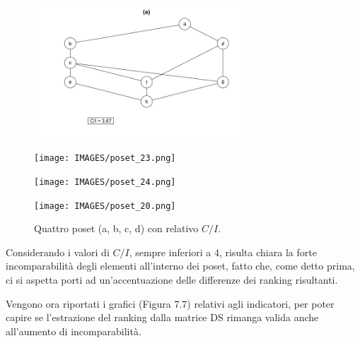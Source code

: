 \documentclass{report}
\begin{document}
\begin{figure}[H]
  \centering
  \begin{minipage}[b]{0.4\textwidth}
    \includegraphics[width=8cm]{IMAGES/poset_17.png}
  \end{minipage}
  \hfill
  \begin{minipage}[b]{0.4\textwidth}
    \texttt{[image: IMAGES/poset\_23.png]}
  \end{minipage}
  \hfill
  \begin{minipage}[b]{0.4\textwidth}
    \texttt{[image: IMAGES/poset\_24.png]}
  \end{minipage}
  \hfill
  \begin{minipage}[b]{0.4\textwidth}
    \texttt{[image: IMAGES/poset\_20.png]}
  \end{minipage}
  \caption{Quattro poset (a, b, c, d) con relativo $C/I$.}
\end{figure}

Considerando i valori di $C/I$, sempre inferiori a 4, risulta chiara la forte incomparabilità degli elementi all'interno dei poset, fatto che, come detto prima, ci si aspetta porti ad un'accentuazione delle differenze dei ranking risultanti.


Vengono ora riportati i grafici (Figura 7.7) relativi agli indicatori, per poter capire se l'estrazione del ranking dalla matrice DS rimanga valida anche all'aumento di incomparabilità. 
\end{document}
